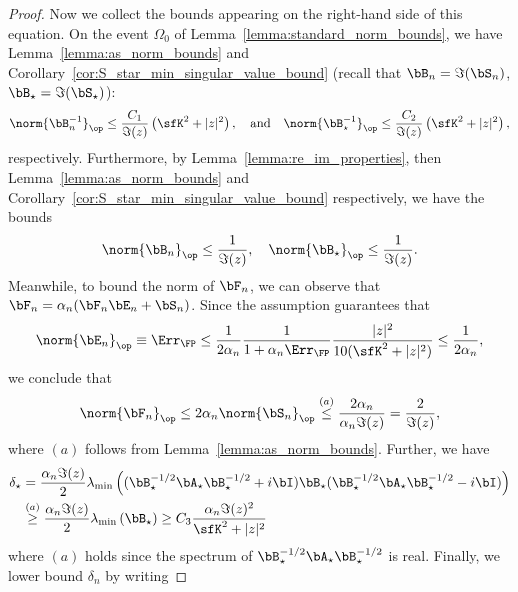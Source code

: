 \begin{proof}
Now we collect the bounds appearing on the right-hand side of this equation. On the event $\Omega_0$ of Lemma~\ref{lemma:standard_norm_bounds}, we have Lemma~\ref{lemma:as_norm_bounds} and  Corollary~\ref{cor:S_star_min_singular_value_bound}
(recall that $\bB_n=\Im(\bS_n)$, $\bB_{\star}=\Im(\bS_{\star})$): 
\begin{equation}
\nonumber
    \norm{\bB_n^{-1}}_\op \le  \frac{C_1}{\Im(z)} \left( \sfK^2 + |z|^2 \right),\quad\textrm{and}\quad
    \norm{\bB_\star^{-1}}_\op \le \frac{C_2}{\Im(z)}\left(\sfK^2 + |z|^2\right),
\end{equation}
respectively.
Furthermore, by Lemma~\ref{lemma:re_im_properties}, then Lemma~\ref{lemma:as_norm_bounds} and Corollary~\ref{cor:S_star_min_singular_value_bound} respectively, we have the bounds
\begin{equation}
\nonumber
   \norm{\bB_n}_\op \le \frac1{\Im(z)},\quad  \norm{\bB_\star}_\op \le\frac1{\Im(z)}.
\end{equation}
Meanwhile, to bound the norm of $\bF_n$, we  can observe that 
    $\bF_n = \alpha_n (\bF_n \bE_n + \bS_n)$.
Since the assumption guarantees that
\begin{equation}
\label{eq:bound_En}
\norm{\bE_n}_\op \equiv \Err_{\FP} \le \frac1{2\alpha_n}  \frac1{1+\alpha_n \Err_{\FP}} \frac{|z|^2}{10(\sfK^2 + |z|^2)} \le \frac1{2\alpha_n},
\end{equation}
we conclude that 
\begin{equation}
\nonumber
    \norm{\bF_n}_\op \le 2\alpha_n \norm{\bS_n}_\op \stackrel{(a)}{\le} \frac{2\alpha_n}{\alpha_n \Im(z)} = \frac{2}{\Im(z)},
\end{equation}
where $(a)$ follows from Lemma~\ref{lemma:as_norm_bounds}.
Further, we have
\begin{align}
\label{eq:lb_delta_star}
\delta_{\star} &= \frac{\alpha_n \Im(z)}{2} \lambda_{\min}\left(  
(\bB_\star^{-1/2}\bA_\star\bB_\star^{-1/2} + i \bI)\bB_\star (\bB_\star^{-1/2}\bA_\star\bB_\star^{-1/2} - i\bI)
\right) \\
&\stackrel{(a)}{\ge} \frac{\alpha_n\Im(z)}{2} \lambda_{\min}\left(\bB_\star\right) \ge 
 C_3\frac{\alpha_n\Im(z)^2}{\sfK^2 + |z|^2} 
 \nonumber
\end{align}
where $(a)$ holds since the spectrum of $\bB_{\star}^{-1/2}\bA_{\star}\bB_{\star}^{-1/2}$ is real.
Finally, we lower bound $\delta_n$ by writing

\end{proof}
